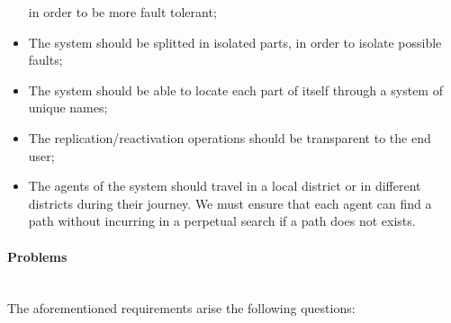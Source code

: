 \begin{itemize}
  in order to be more fault tolerant;
\item The system should be splitted in isolated parts, in order to isolate
  possible faults;
\item The system should be able to locate each part of itself through a system
  of unique names;
\item The replication/reactivation operations should be transparent to the end
  user;
\item The agents of the system should travel in a local district or in different
districts during their journey. We must ensure that each agent can find a path
without incurring in a perpetual search if a path does not exists.
\end{itemize}

\paragraph{Problems} \mbox{} \\

The aforementioned requirements arise the following questions:

